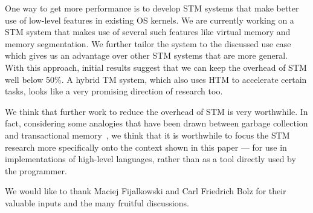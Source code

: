 \documentclass{sigplanconf}
\begin{document}
One way to get more performance is to develop STM systems that make
better use of low-level features in existing OS kernels.  We are
currently working on a STM system that makes use of several such
features like virtual memory and memory segmentation.  We further
tailor the system to the discussed use case which gives us an
advantage over other STM systems that are more general. With this
approach, initial results suggest that we can keep the overhead of STM
well below 50\%. A hybrid TM system, which also uses HTM to accelerate
certain tasks, looks like a very promising direction of research
too.

We think that further work to reduce the overhead of STM is
very worthwhile. In fact, considering some analogies that have been
drawn between garbage collection and transactional memory~\cite{dan07},
we think that it is worthwhile to focus the STM research more
specifically onto the context shown in this paper --- for use in
implementations of high-level languages, rather than as a tool
directly used by the programmer.






\acks
We would like to thank Maciej Fijalkowski and Carl Friedrich Bolz for
their valuable inputs and the many fruitful discussions.




\end{document}
